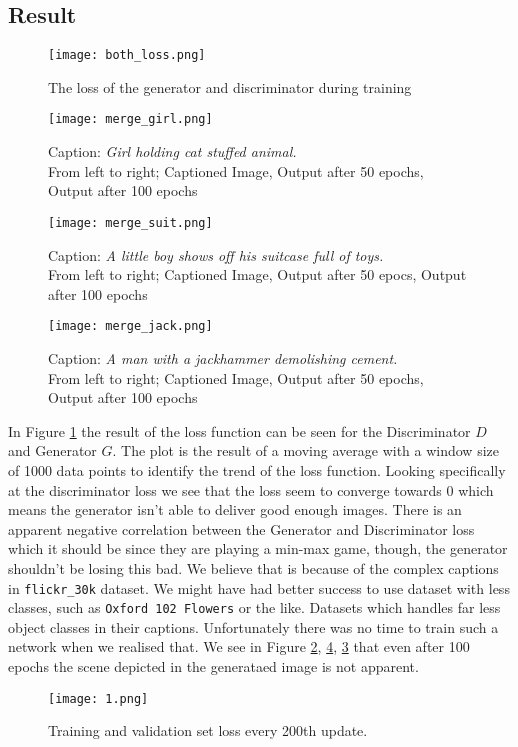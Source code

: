 \documentclass[../main.tex]{subfiles}
\begin{document}
\subsection{Result}
\begin{figure}[h]
    \centering
    \texttt{[image: both\_loss.png]}
    \caption{The loss of the generator and discriminator during training}
    \label{fig:both_loss}
\end{figure}
\begin{figure}[h]
    \centering
    \texttt{[image: merge\_girl.png]}
    \caption{Caption: \textit{Girl holding cat stuffed animal.} \\From left to right; Captioned Image, Output after 50 epochs, Output after 100 epochs}
    \label{fig:res_girl}
\end{figure}
\begin{figure}[h]
    \centering
    \texttt{[image: merge\_suit.png]}
    \caption{Caption: \textit{A little boy shows off his suitcase full of toys.} \\From left to right; Captioned Image, Output after 50 epocs, Output after 100 epochs}
    \label{fig:res_suit}
\end{figure}
\begin{figure}[h]
    \centering
    \texttt{[image: merge\_jack.png]}
    \caption{Caption: \textit{A man with a jackhammer demolishing cement.} \\
    From left to right; Captioned Image, Output after 50 epochs, Output after 100 epochs}
    \label{fig:res_jack}
\end{figure}

In Figure \ref{fig:both_loss} the result of the loss function can be seen for the Discriminator $D$ and Generator $G$. The plot is the result of a moving average with a window size of 1000 data points to identify the trend of the loss function. Looking specifically at the discriminator loss we see that the loss seem to converge towards 0 which means the generator isn't able to deliver good enough images. There is an apparent negative correlation between the Generator and Discriminator loss which it should be since they are playing a min-max game, though, the generator shouldn't be losing this bad. We believe that is because of the complex captions in \texttt{flickr\_30k} dataset. We might have had better success to use dataset with less classes, such as \texttt{Oxford 102 Flowers} or the like. Datasets which handles far less object classes in their captions. Unfortunately there was no time to train such a network when we realised that.
We see in Figure \ref{fig:res_girl}, \ref{fig:res_jack}, \ref{fig:res_suit} that even after 100 epochs the scene depicted in the generataed image is not apparent.
\begin{figure}[h]
    \centering
    \texttt{[image: 1.png]}
    \caption{Training and validation set loss every 200th update.}
    \label{fig:speechloss}
\end{figure}
\end{document}
